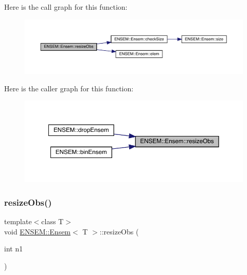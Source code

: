 Here is the call graph for this function\+:
\nopagebreak
\begin{figure}[H]
\begin{center}
\leavevmode
\includegraphics[width=350pt]{d7/d3e/classENSEM_1_1Ensem_a20ee27dffc4b1db635103ce40fb0d5c2_cgraph}
\end{center}
\end{figure}
Here is the caller graph for this function\+:
\nopagebreak
\begin{figure}[H]
\begin{center}
\leavevmode
\includegraphics[width=350pt]{d7/d3e/classENSEM_1_1Ensem_a20ee27dffc4b1db635103ce40fb0d5c2_icgraph}
\end{center}
\end{figure}
\mbox{\label{classENSEM_1_1Ensem_a20ee27dffc4b1db635103ce40fb0d5c2}} 
\subsubsection{\texorpdfstring{resizeObs()}{resizeObs()}\hspace{0.1cm}{\footnotesize\ttfamily [2/12]}}
{\footnotesize\ttfamily template$<$class T$>$ \\
void \mbox{\hyperlink{classENSEM_1_1Ensem}{E\+N\+S\+E\+M\+::\+Ensem}}$<$ T $>$\+::resize\+Obs (\begin{DoxyParamCaption}\item[{int}]{n1 }\end{DoxyParamCaption})\hspace{0.3cm}{\ttfamily [inline]}}

